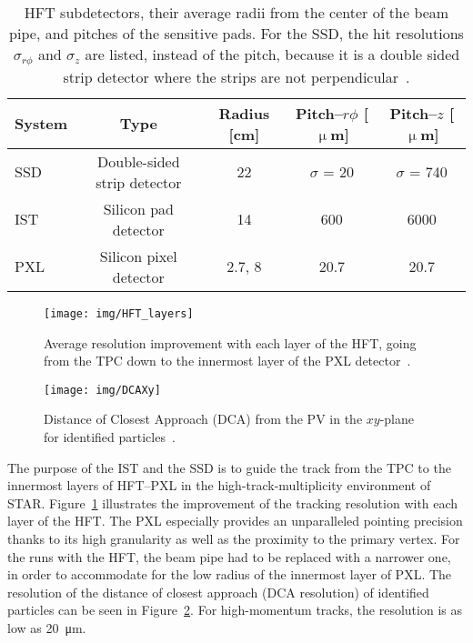 \begin{table}[htb]
\caption{\label{HFTtab}HFT subdetectors, their average radii from the center of the beam pipe, and pitches of the sensitive pads. For the SSD, the hit resolutions $\sigma_{r\phi}$ and $\sigma_z$ are listed, instead of the pitch, because it is a double sided strip detector where the strips are not perpendicular~\cite{HftTdr}.}
\begin{center}
\begin{tabular}{lcccc}
\toprule
System & Type & Radius [cm] & Pitch--$r\phi$ [$\upmu$m] & Pitch--$z$ [$\upmu$m]\\
\midrule
SSD & Double-sided strip detector & 22 & $\sigma$ = 20 & $\sigma$ = 740 \\
IST & Silicon pad detector & 14 & 600 & 6000 \\
PXL & Silicon pixel detector & 2.7, 8 & 20.7 & 20.7 \\
\bottomrule
\end{tabular}
\end{center}
\end{table}


\begin{figure}[!htb]
\begin{center}
 \texttt{[image: img/HFT\_layers]}\\
\end{center}
\caption{\label{HFT_layers}Average resolution improvement with each layer of the HFT, going from the TPC down to the innermost layer of the PXL detector~\cite{KubaVyzkumak}.}
\end{figure}



\begin{figure}[!htb]
\begin{center}
 \texttt{[image: img/DCAXy]}\\
\end{center}
\caption{\label{DCA}Distance of Closest Approach (DCA) from the PV in the $xy$-plane for identified particles~\cite{D0v2paper}.}
\end{figure}

The purpose of the IST and the SSD is to guide the track from the TPC to the innermost layers of HFT--PXL in the high-track-multiplicity environment of STAR. Figure~\ref{HFT_layers} illustrates the improvement of the tracking resolution with each layer of the HFT\@. The PXL especially provides an unparalleled pointing precision thanks to its high granularity as well as the proximity to the primary vertex. For the runs with the HFT, the beam pipe had to be replaced with a narrower one, in order to accommodate for the low radius of the innermost layer of PXL\@. The resolution of the distance of closest approach (DCA resolution) of identified particles can be seen in Figure~\ref{DCA}. For high-momentum tracks, the resolution is as low as \SI{20}{\micro\metre}.



